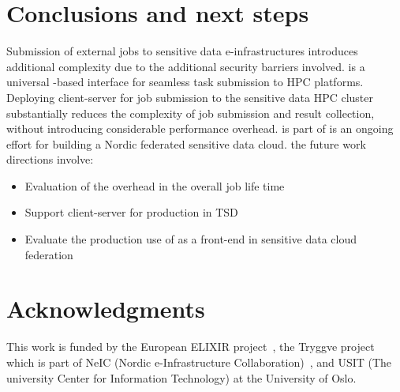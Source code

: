 \section{Conclusions and next steps}
\label{sec:conclusions}

Submission of external jobs to sensitive data e-infrastructures introduces additional complexity due to the additional security barriers involved. \name is a universal \fs-based interface for seamless task submission to HPC platforms. Deploying \name client-server for job submission to the sensitive data HPC cluster substantially reduces the complexity of job submission and result collection, without introducing considerable performance overhead. \name is part of is an ongoing effort for building a Nordic federated sensitive data cloud. the future work directions involve:
\begin{itemize}
	\item Evaluation of the \name overhead in the overall job life time
	\item Support \name client-server for production in TSD
	\item Evaluate the production use of \name as a front-end in sensitive data cloud federation 
\end{itemize}

\section{Acknowledgments}
This work is funded by the European ELIXIR project~\cite{elixir}, the Tryggve project~\cite{tryggve} which is part of NeIC (Nordic e-Infrastructure Collaboration)~\cite{neic}, and USIT (The university Center for Information Technology) at the University of Oslo. 